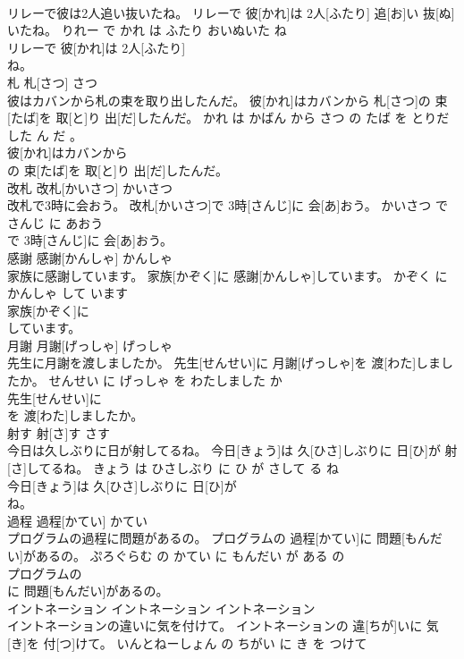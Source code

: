 \documentclass[8pt]{extreport}
\begin{document}
\begin{CJK}{UTF8}{min}
\\	リレーで彼は2人追い抜いたね。	リレーで 彼[かれ]は 2人[ふたり] 追[お]い 抜[ぬ]いたね。	りれー で かれ は ふたり おいぬいた ね	
\\	リレーで 彼[かれ]は 2人[ふたり]
\\	ね。			
\\	札	札[さつ]	さつ	
\\	彼はカバンから札の束を取り出したんだ。	彼[かれ]はカバンから 札[さつ]の 束[たば]を 取[と]り 出[だ]したんだ。	かれ は かばん から さつ の たば を とりだした ん だ 。	
\\	彼[かれ]はカバンから
\\	の 束[たば]を 取[と]り 出[だ]したんだ。			
\\	改札	改札[かいさつ]	かいさつ	
\\	改札で3時に会おう。	改札[かいさつ]で 3時[さんじ]に 会[あ]おう。	かいさつ で さんじ に あおう	
\\	で 3時[さんじ]に 会[あ]おう。			
\\	感謝	感謝[かんしゃ]	かんしゃ	
\\	家族に感謝しています。	家族[かぞく]に 感謝[かんしゃ]しています。	かぞく に かんしゃ して います	
\\	家族[かぞく]に
\\	しています。			
\\	月謝	月謝[げっしゃ]	げっしゃ	
\\	先生に月謝を渡しましたか。	先生[せんせい]に 月謝[げっしゃ]を 渡[わた]しましたか。	せんせい に げっしゃ を わたしました か	
\\	先生[せんせい]に
\\	を 渡[わた]しましたか。			
\\	射す	射[さ]す	さす	
\\	今日は久しぶりに日が射してるね。	今日[きょう]は 久[ひさ]しぶりに 日[ひ]が 射[さ]してるね。	きょう は ひさしぶり に ひ が さして る ね	
\\	今日[きょう]は 久[ひさ]しぶりに 日[ひ]が
\\	ね。			
\\	過程	過程[かてい]	かてい	
\\	プログラムの過程に問題があるの。	プログラムの 過程[かてい]に 問題[もんだい]があるの。	ぷろぐらむ の かてい に もんだい が ある の	
\\	プログラムの
\\	に 問題[もんだい]があるの。			
\\	イントネーション	イントネーション	イントネーション	
\\	イントネーションの違いに気を付けて。	イントネーションの 違[ちが]いに 気[き]を 付[つ]けて。	いんとねーしょん の ちがい に き を つけて	

\end{CJK}
\end{document}
